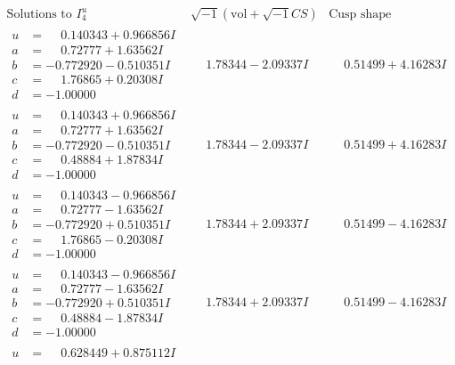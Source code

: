 \documentclass[1p]{elsarticle_modified}
\theoremstyle{definition}
\newcommand{\I}{\sqrt{-1}}
\begin{document}
$$\begin{array}{c|c|c}  
\text{Solutions to }I^u_{4}& \I (\text{vol} + \sqrt{-1}CS) & \text{Cusp shape}\\
 \hline 
\begin{aligned}
u &= \phantom{-}0.140343 + 0.966856 I \\
a &= \phantom{-}0.72777 + 1.63562 I \\
b &= -0.772920 - 0.510351 I \\
c &= \phantom{-}1.76865 + 0.20308 I \\
d &= -1.00000\phantom{ +0.000000I}\end{aligned}
 & \phantom{-}1.78344 - 2.09337 I & \phantom{-}0.51499 + 4.16283 I \\ \hline\begin{aligned}
u &= \phantom{-}0.140343 + 0.966856 I \\
a &= \phantom{-}0.72777 + 1.63562 I \\
b &= -0.772920 - 0.510351 I \\
c &= \phantom{-}0.48884 + 1.87834 I \\
d &= -1.00000\phantom{ +0.000000I}\end{aligned}
 & \phantom{-}1.78344 - 2.09337 I & \phantom{-}0.51499 + 4.16283 I \\ \hline\begin{aligned}
u &= \phantom{-}0.140343 - 0.966856 I \\
a &= \phantom{-}0.72777 - 1.63562 I \\
b &= -0.772920 + 0.510351 I \\
c &= \phantom{-}1.76865 - 0.20308 I \\
d &= -1.00000\phantom{ +0.000000I}\end{aligned}
 & \phantom{-}1.78344 + 2.09337 I & \phantom{-}0.51499 - 4.16283 I \\ \hline\begin{aligned}
u &= \phantom{-}0.140343 - 0.966856 I \\
a &= \phantom{-}0.72777 - 1.63562 I \\
b &= -0.772920 + 0.510351 I \\
c &= \phantom{-}0.48884 - 1.87834 I \\
d &= -1.00000\phantom{ +0.000000I}\end{aligned}
 & \phantom{-}1.78344 + 2.09337 I & \phantom{-}0.51499 - 4.16283 I \\ \hline\begin{aligned}
u &= \phantom{-}0.628449 + 0.875112 I \\

\end{aligned}
\end{array}$$
\end{document}
